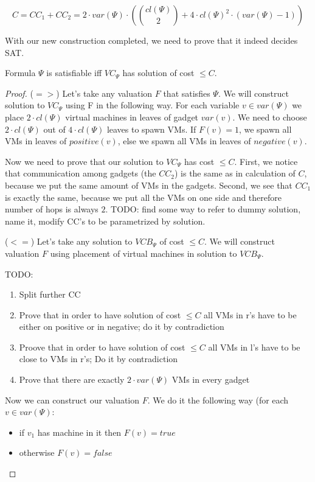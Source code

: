 $$ C = CC_1 + CC_2 = 2 \cdot var(\Psi) \cdot ({ cl(\Psi) \choose 2} +
4 \cdot cl(\Psi) ^2 \cdot (var(\Psi) - 1)) $$


With our new construction completed, we need to prove that it indeed
decides SAT.

\begin{theorem}Formula $\Psi$ is satisfiable iff $VC_{\Psi}$ has
solution of cost $\leq C$.
\end{theorem}

\begin{proof}
($=>$)
Let's take any valuation $F$ that satisfies $\Psi$. We will construct
solution to $VC_{\Psi}$ using F in the following way. For each
variable $v \in var(\Psi)$ we place $2 \cdot cl(\Psi)$ virtual machines in
leaves of gadget $var(v)$. We need to choose $2\cdot cl(\Psi)$ out of
$4 \cdot cl(\Psi)$ leaves to spawn VMs. If $F(v) = 1$, we spawn all VMs in leaves
of $positive(v)$, else we spawn all VMs in leaves of
$negative(v)$.

Now we need to prove that our solution to $VC_{\Psi}$
has cost $\leq C$. First, we notice that communication among gadgets
(the $CC_2$) is the same as in calculation of $C$, because we put the
same amount of VMs in the gadgets. Second, we see that $CC_1$ is
exactly the same, because we put all the VMs on one side and therefore
number of hops is always $2$. TODO: find some way to refer to dummy
solution, name it, modify CC's to be parametrized by solution.

($<=$) Let's take any solution to $VCB_{\Psi}$ of cost $\leq C$. We
will construct valuation $F$ using placement of virtual machines in
solution to $VCB_{\Psi}$.

TODO:
\begin{enumerate}
\item Split further CC
\item Prove that in order to have solution of cost $\leq C$ all VMs in
r's have to be either on positive or in negative; do it by contradiction
\item Proove that in order to have solution of cost $\leq C$ all VMs
in l's have to be close to VMs in r's;
Do it by contradiction
\item Prove that there are exactly $2\cdot var(\Psi)$ VMs in every
gadget
\end{enumerate}

Now we can construct our valuation $F$. We do it the following way
(for each $v \in var(\Psi)$:

\begin{itemize}
\item if $v_1$ has machine in it then $F(v) = true$
\item otherwise $F(v) = false$
\end{itemize}


\end{proof}
